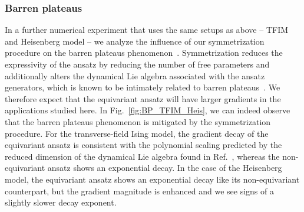 \documentclass[a4paper,twocolumn,notitlepage,nofootinbib,superscriptaddress,floatfix]{revtex4-2}
\begin{document}
\subsubsection*{Barren plateaus}
In a further numerical experiment that uses the same setups as above -- TFIM and Heisenberg model -- we analyze the influence of our symmetrization procedure on the barren plateaus phenomenon~\cite{Holmes_2022,McClean_2018}. Symmetrization reduces the expressivity of the ansatz by reducing the number of free parameters and additionally alters the dynamical Lie algebra associated with the ansatz generators, which is known to be intimately related to barren plateaus~\cite{BP_OptControl}. 
We therefore expect that the equivariant ansatz will have larger gradients in the applications studied here. 
In Fig.~\ref{fig:BP_TFIM_Heis}, we can indeed observe that the barren plateaus phenomenon is mitigated by the symmetrization procedure. 
For the transverse-field Ising model, the gradient decay of the equivariant ansatz is consistent with the polynomial scaling predicted by the reduced dimension of the dynamical Lie algebra found in Ref.~\cite{BP_OptControl}, whereas the non-equivariant ansatz shows an exponential decay. In the case of the Heisenberg model, the equivariant ansatz shows an exponential decay like its non-equivariant counterpart, but the gradient magnitude is enhanced and we see signs of a slightly slower decay exponent.
\end{document}
